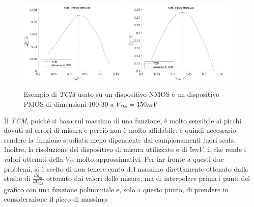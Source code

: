 \documentclass[12pt, letterpaper]{book}
\begin{document}
\begin{figure}[h!]
  \centering
  \includegraphics[width=0.49\textwidth]{TCM-N4-100-30-NoFit}
  \includegraphics[width=0.49\textwidth]{TCM-P1-100-30-NoFit}
  \caption{Esempio di \emph{TCM} usato su un dispositivo NMOS e un dispositivo PMOS di dimensioni 100-30 a $V_{DS} = 150 mV$}
\end{figure}

Il \emph{TCM}, poiché si basa sul massimo di una funzione, è molto sensibile ai picchi dovuti ad errori di misura e perciò non è molto affidabile: è quindi necessario rendere la funzione studiata meno dipendente dai campionamenti fuori scala. Inoltre, la risoluzione del dispositivo di misura utilizzato e di $5 mV$, il che rende i valori ottenuti della $V_{th}$ molto approssimativi.
Per far fronte a questi due problemi, si è scelto di non tenere conto del massimo direttamente ottenuto dallo studio di $\frac{dg_m}{dV_{GS}}$ ottenuto dai valori delle misure, ma di interpolare prima i punti del grafico con una funzione polinomiale e, solo a questo punto, di prendere in considerazione il picco di massimo. \\
\end{document}
